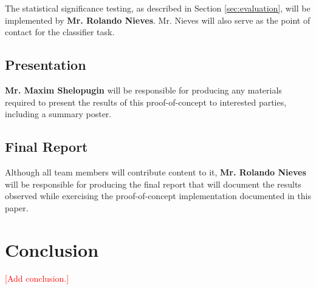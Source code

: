 \documentclass[conference]{sig-alternate-05-2015}
\newcommand{\todo}[1]{{\textcolor{red}{[#1]}}}
\begin{document}
The statistical significance testing, as described in Section
\ref{sec:evaluation}, will be implemented by \textbf{Mr. Rolando Nieves}. Mr.
Nieves will also serve as the point of contact for the classifier task.

\subsection{Presentation}\label{sec:presentation_task}
\textbf{Mr. Maxim Shelopugin} will be responsible for producing any materials
required to present the results of this proof-of-concept to interested parties,
including a summary poster.

\subsection{Final Report}\label{sec:report_task}
Although all team members will contribute content to it,
\textbf{Mr. Rolando Nieves} will be responsible for producing the final report
that will document the results observed while exercising the proof-of-concept
implementation documented in this paper.

\section{Conclusion}\label{sec:conclusion}
\todo{Add conclusion.}



\end{document}
